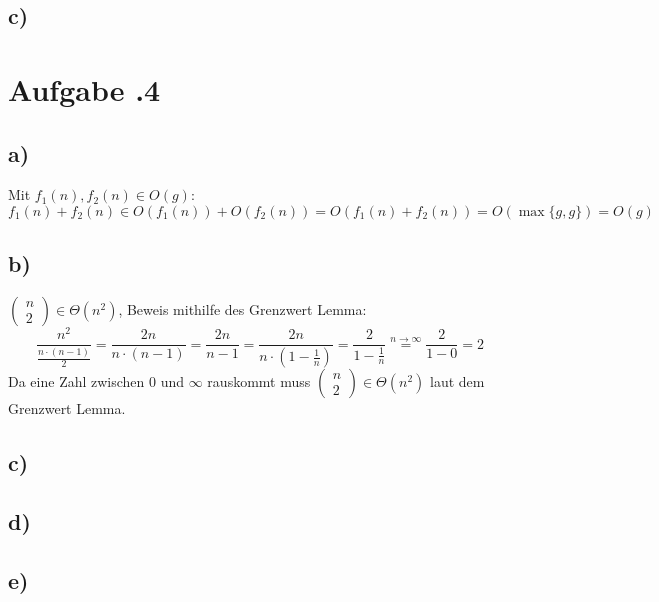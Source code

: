 \documentclass[12pt,german,a4paper]{article}
\begin{document}
	\subsection*{c)}
	
  \newpage
	\section*{Aufgabe \bn.4}
	\subsection*{a)}
	Mit $f_1(n),f_2(n)\in O(g)$:
	$$ f_1(n)+f_2(n) \in O(f_1(n)) + O(f_2(n))=O(f_1(n)+f_2(n))=O(\max\{g,g\})=O(g)$$
	\subsection*{b)}
	$\begin{pmatrix}n\\2\end{pmatrix}\in\Theta(n^2)$, Beweis mithilfe des Grenzwert Lemma:
	$$
	\frac{ n^2 }{ \frac{ n\cdot(n-1) }{ 2 } } = \frac{ 2n }{ n\cdot(n-1) } =\frac{ 2n }{ n-1 } =\frac{ 2n }{ n\cdot(1-\frac{ 1 }{ n } ) } =\frac{ 2 }{ 1-\frac{ 1 }{ n }  } \overset{n \rightarrow \infty}{=} \frac{ 2 }{ 1-0 } = 2
	$$
	Da eine Zahl zwischen 0 und $\infty$ rauskommt muss $\begin{pmatrix}n\\2\end{pmatrix}\in\Theta(n^2)$ laut dem Grenzwert Lemma.
	\subsection*{c)}
	\subsection*{d)}
	\subsection*{e)}
	
	
	
\end{document}
